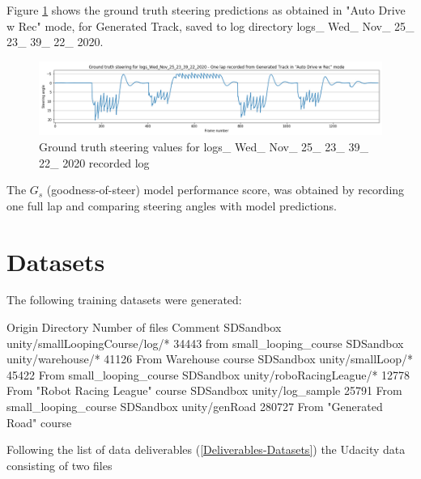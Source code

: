 Figure \ref{fig:genTrackOneLap_logs_Wed_Nov_25_23_39_22_2020_ground_truth_steering_angles} shows the ground truth steering predictions as obtained in "Auto Drive w Rec" mode, for Generated Track, saved to log directory logs\_ Wed\_ Nov\_ 25\_ 23\_ 39\_ 22\_ 2020.

\begin{figure}[ht]
 \centering 
 \includegraphics[width=\textwidth]{Figures/genTrackOneLap_logs_Wed_Nov_25_23_39_22_2020_ground_truth_steering_angles.png}
 \caption{Ground truth steering values for logs\_ Wed\_ Nov\_ 25\_ 23\_ 39\_ 22\_ 2020 recorded log}
 \label{fig:genTrackOneLap_logs_Wed_Nov_25_23_39_22_2020_ground_truth_steering_angles} 
\end{figure}
The $G_s$ (goodness-of-steer) model performance score, was obtained by recording one full lap and comparing steering angles with model predictions.

\section{Datasets}

The following training datasets were generated:

Origin  Directory   Number of files Comment
SDSandbox   unity/smallLoopingCourse/log/* 34443 from small\_looping\_course
SDSandbox   unity/warehouse/*   41126 From Warehouse course
SDSandbox   unity/smallLoop/*   45422   From small\_looping\_course
SDSandbox   unity/roboRacingLeague/* 12778 From "Robot Racing League" course
SDSandbox   unity/log\_sample   25791   From small\_looping\_course
SDSandbox   unity/genRoad 280727 From "Generated Road" course



Following the list of data deliverables (\ref{Deliverables-Datasets}) the Udacity data consisting of two files 



